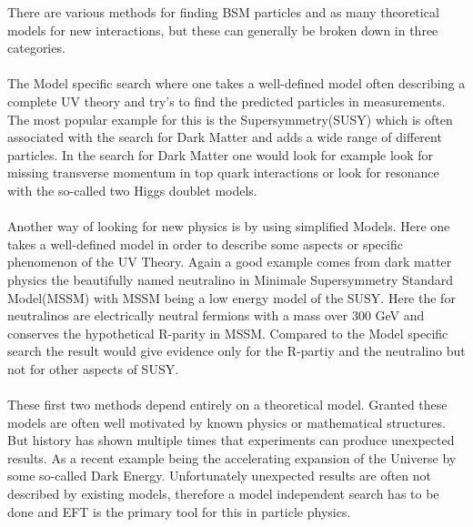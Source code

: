 \documentclass[../Bachelorarbeit.tex]{subfiles}
\begin{document}
There are various methods for finding BSM particles and as many theoretical models for new interactions, but these can generally be broken down in three categories.
\\\\
The Model specific search where one takes a well-defined model often describing a complete UV theory and try's to find the predicted particles in measurements.
The most popular example for this is the Supersymmetry(SUSY) which is often associated with the search for Dark Matter and adds a wide range of different particles.
In the search for Dark Matter one would look for example look for missing transverse momentum in top quark interactions or look for resonance with the so-called
two Higgs doublet models.
\\\\
Another way of looking for new physics is by using simplified Models. Here one takes a well-defined model in order to describe some aspects or specific phenomenon of the UV Theory.
Again a good example comes from dark matter physics the beautifully named neutralino in Minimale Supersymmetry Standard Model(MSSM) with MSSM being a low energy model of the SUSY.
Here the for neutralinos are electrically neutral fermions with a mass over 300 GeV and conserves the hypothetical R-parity in MSSM. Compared to the Model specific search the result
would give evidence only for the R-partiy and the neutralino but not for other aspects of SUSY.
\\\\
These first two methods depend entirely on a theoretical model. Granted these models are often well motivated by known physics or mathematical structures.
But history has shown multiple times that experiments can produce unexpected results. As a recent example being the accelerating expansion of the Universe by some so-called Dark Energy.
Unfortunately unexpected results are often not described by existing models, therefore a model independent search has to be done and EFT is the primary tool for this in particle physics.
\end{document}
